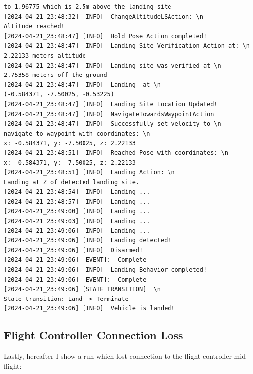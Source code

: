 \begin{lstlisting}
to 1.96775 which is 2.5m above the landing site
[2024-04-21_23:48:32] [INFO]  ChangeAltitudeLSAction: \n 
Altitude reached!
[2024-04-21_23:48:47] [INFO]  Hold Pose Action completed!
[2024-04-21_23:48:47] [INFO]  Landing Site Verification Action at: \n 
2.22133 meters altitude
[2024-04-21_23:48:47] [INFO]  Landing site was verified at \n 
2.75358 meters off the ground
[2024-04-21_23:48:47] [INFO]  Landing  at \n 
(-0.584371, -7.50025, -0.53225)
[2024-04-21_23:48:47] [INFO]  Landing Site Location Updated!
[2024-04-21_23:48:47] [INFO]  NavigateTowardsWaypointAction
[2024-04-21_23:48:47] [INFO]  Successfully set velocity to \n 
navigate to waypoint with coordinates: \n 
x: -0.584371, y: -7.50025, z: 2.22133
[2024-04-21_23:48:51] [INFO]  Reached Pose with coordinates: \n 
x: -0.584371, y: -7.50025, z: 2.22133
[2024-04-21_23:48:51] [INFO]  Landing Action: \n 
Landing at Z of detected landing site.
[2024-04-21_23:48:54] [INFO]  Landing ...
[2024-04-21_23:48:57] [INFO]  Landing ...
[2024-04-21_23:49:00] [INFO]  Landing ...
[2024-04-21_23:49:03] [INFO]  Landing ...
[2024-04-21_23:49:06] [INFO]  Landing ...
[2024-04-21_23:49:06] [INFO]  Landing detected!
[2024-04-21_23:49:06] [INFO]  Disarmed!
[2024-04-21_23:49:06] [EVENT]:  Complete
[2024-04-21_23:49:06] [INFO]  Landing Behavior completed!
[2024-04-21_23:49:06] [EVENT]:  Complete
[2024-04-21_23:49:06] [STATE TRANSITION]  \n 
State transition: Land -> Terminate
[2024-04-21_23:49:06] [INFO]  Vehicle is landed!

\end{lstlisting}

\subsection{Flight Controller Connection Loss}
Lastly, hereafter I show a run which lost connection to the flight controller mid-flight:

